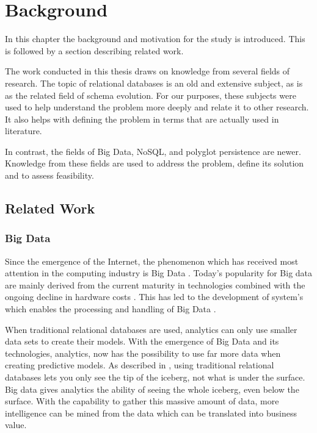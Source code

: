 \chapter{Background}
\label{chap:background}
In this chapter the background and motivation for the study is introduced. This is followed by a section describing related work.

The work conducted in this thesis draws on knowledge from several fields of research. The topic of relational databases is an old and extensive subject, as is as the related field of schema evolution. For our purposes, these subjects were used to help understand the problem more deeply and relate it to other research. It also helps with defining the problem in terms that are actually used in literature.  

In contrast, the fields of Big Data, NoSQL, and polyglot persistence are newer. Knowledge from these fields are used to address the problem, define its solution and to assess feasibility. 


\section{Related Work}

\subsection{Big Data}
Since the emergence of the Internet, the phenomenon which has received most attention in the computing industry is Big Data \cite{bigDataWarehouse}. Today's popularity for Big data are mainly derived from the current maturity in technologies combined with the ongoing decline in hardware costs \cite{bigDataWarehouse, bigDatabigAn}. This has led to the development of system's which enables the processing and handling of Big Data \cite{bigDataWarehouse}.

When traditional relational databases are used, analytics can only use smaller data sets to create their models. With the emergence of Big Data and its technologies, analytics, now has the possibility to use far more data when creating predictive models. As described in \cite{bigDatabigAn}, using traditional relational databases lets you only see the tip of the iceberg, not what is under the surface. Big data gives analytics the ability of seeing the whole iceberg, even below the surface. With the capability to gather this massive amount of data, more intelligence can be mined from the data which can be translated into business value. \cite{bigDataMane} 


